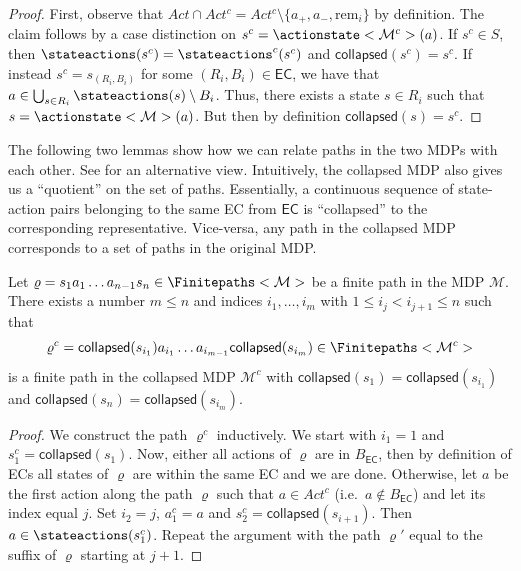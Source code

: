 \documentclass{theoretics}
\newcommand{\intersectionSym}{\cap}
\newcommand{\intersectionBin}{\mathbin{\intersectionSym}}
\newcommand{\UnionSym}{\bigcup}
\newcommand{\intersection}{\intersectionBin}
\newcommand{\Union}{\UnionSym}
\newcommand{\MDP}{\mathcal{M}}
\newcommand{\States}{S}
\newcommand{\Actions}{Act}
\newcommand{\finitepath}{\varrho}
\newcommand{\ecremain}{\mathrm{rem}}
\newcommand{\eccollapsed}{\mathsf{collapsed}}
\newcommand{\algoecs}{\mathsf{EC}}
\begin{document}
\begin{proof}
	First, observe that $\Actions \intersection \Actions^c = \Actions^c \setminus \{a_+, a_-, \ecremain_i\}$ by definition.
	The claim follows by a case distinction on $s^c = \actionstate<\MDP^c>(a)$.
	If $s^c \in \States$, then $\stateactions(s^c) = \stateactions^c(s^c)$ and $\eccollapsed(s^c) = s^c$.
	If instead $s^c = s_{(R_i, B_i)}$ for some $(R_i, B_i) \in \algoecs$, we have that $a \in \Union_{s \in R_i} \stateactions(s) \setminus B_i$.
	Thus, there exists a state $s \in R_i$ such that $s = \actionstate<\MDP>(a)$.
	But then by definition $\eccollapsed(s) = s^c$. 
\end{proof}
The following two lemmas show how we can relate paths in the two MDPs with each other.
See \cite[Section~6.4.1]{de1997formal} for an alternative view.
Intuitively, the collapsed MDP also gives us a \enquote{quotient} on the set of paths.
Essentially, a continuous sequence of state-action pairs belonging to the same EC from $\algoecs$ is \enquote{collapsed} to the corresponding representative.
Vice-versa, any path in the collapsed MDP corresponds to a set of paths in the original MDP.
\begin{lemma} \label{stm:collapse:path_normal_to_collapsed}
	Let $\finitepath = s_1 a_1 \dots a_{n-1} s_n \in \Finitepaths<\MDP>$ be a finite path in the MDP $\MDP$.
	There exists a number $m \leq n$ and indices $i_1, \dots, i_m$ with $1 \leq i_j < i_{j+1} \leq n$ such that
    \begin{equation*}
        \finitepath^c = \eccollapsed(s_{i_1}) a_{i_1} \dots a_{i_{m-1}} \eccollapsed(s_{i_m}) \in \Finitepaths<\MDP^c>    
    \end{equation*}
    is a finite path in the collapsed MDP $\MDP^c$ with $\eccollapsed(s_1) = \eccollapsed(s_{i_1})$ and $\eccollapsed(s_n) = \eccollapsed(s_{i_m})$.
\end{lemma}
\begin{proof}
	We construct the path $\finitepath^c$ inductively.
	We start with $i_1 = 1$ and $s_1^c = \eccollapsed(s_1)$.
	Now, either all actions of $\finitepath$ are in $B_\algoecs$, then by definition of ECs all states of $\finitepath$ are within the same EC and we are done.
	Otherwise, let $a$ be the first action along the path $\finitepath$ such that $a \in \Actions^c$ (i.e.\ $a \notin B_\algoecs$) and let its index equal $j$.
	Set $i_2 = j$, $a_1^c = a$ and $s_2^c = \eccollapsed(s_{i+1})$.
	Then $a \in \stateactions(s_1^c)$.
	Repeat the argument with the path $\finitepath'$ equal to the suffix of $\finitepath$ starting at $j + 1$. 
\end{proof}
\end{document}
